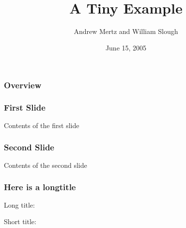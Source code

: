 \documentclass{beamer}
\title{A Tiny Example}
\author{Andrew Mertz\inst{1} and William Slough\inst{2}}
\institute{\inst{1} University of \LaTeX \and \inst{2} University of Naboo}
\date{June 15, 2005}
\begin{document}
\maketitle

\begin{frame}
    \frametitle{Overview}
    \tableofcontents[hideallsubsection]
\end{frame}

\begin{frame}
    \frametitle{First Slide}
    Contents of the first slide
\end{frame}

\begin{frame}
    \frametitle{Second Slide}
    Contents of the second slide
\end{frame}

\begin{frame}
    \frametitle[Short title]{Here is a longtitle}
    
    Long title: \insertsection
    
    Short title: \insertsectionhead
\end{frame}
\end{document}
